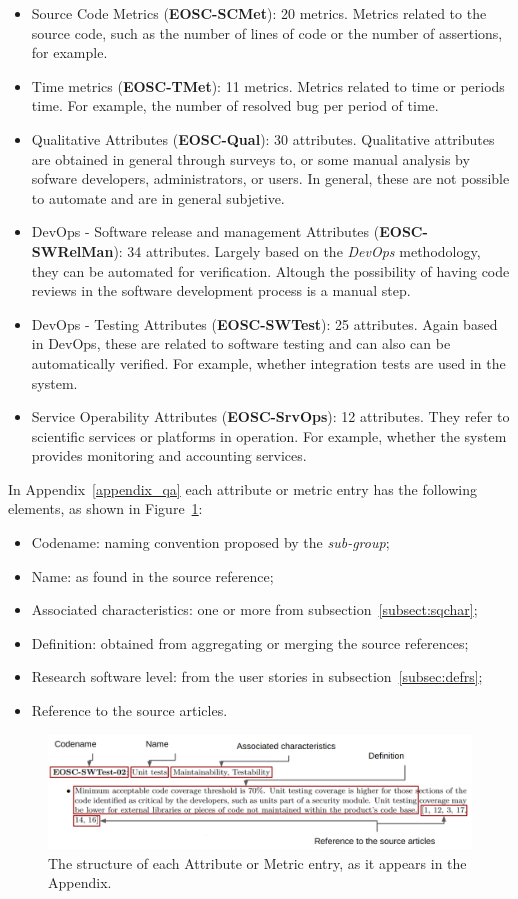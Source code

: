 \begin{itemize}
    \item Source Code Metrics (\textbf{EOSC-SCMet}): 20 metrics. Metrics related to the source code, such as the number of lines of code or the number of assertions, for example.

    \item Time metrics (\textbf{EOSC-TMet}): 11 metrics. Metrics related to time or periods time. For example, the number of resolved bug per period of time.

    \item Qualitative Attributes (\textbf{EOSC-Qual}): 30 attributes. Qualitative attributes are obtained in general through surveys to, or some manual analysis by sofware developers, administrators, or users. In general, these are not possible to automate and are in general subjetive.

    \item DevOps - Software release and management Attributes (\textbf{EOSC-SWRelMan}): 34 attributes. Largely based on the \textit{DevOps} methodology, they can be automated for verification. Altough the possibility of having code reviews in the software development process is a manual step.

    \item DevOps - Testing Attributes (\textbf{EOSC-SWTest}): 25 attributes. Again based in DevOps, these are related to software testing and can also can be automatically verified. For example, whether integration tests are used in the system.

    \item Service Operability Attributes (\textbf{EOSC-SrvOps}): 12 attributes. They refer to scientific services or platforms in operation. For example, whether the system provides monitoring and accounting services.
\end{itemize}

In Appendix~\ref{appendix_qa} each attribute or metric entry has the following elements, as shown in Figure~\ref{fig:sqattr}:

\begin{itemize}
    \item Codename: naming convention proposed by the \textit{sub-group};
    \item Name: as found in the source reference;
    \item Associated characteristics: one or more from subsection~\ref{subsect:sqchar};
    \item Definition: obtained from aggregating or merging the source references;
    \item Research software level: from the user stories in subsection~\ref{subsec:defrs};
    \item Reference to the source articles.
\end{itemize}

\begin{figure}[h]
    \centering
    \includegraphics[width=0.99\linewidth]{imgs/qa.png}
    \caption{The structure of each Attribute or Metric entry, as it appears in the Appendix.}
    \label{fig:sqattr}
\end{figure}
